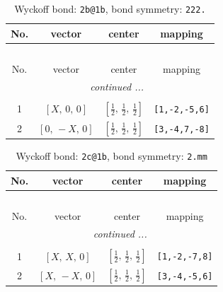 \documentclass[fleqn,8pt]{jsarticle}
\begin{document}
\renewcommand{\arraystretch}{1.2}
\begin{longtable}{cccc}
\caption{Wyckoff bond: {\tt 2b@1b}, bond symmetry: {\tt 222.}}
 \\
 \hline \hline
No. & vector & center & mapping \\ \hline \endfirsthead

\multicolumn{3}{l}{\tablename\ \thetable{}} \\
 \hline \hline
No. & vector & center & mapping \\ \hline \endhead

 \hline \hline
\multicolumn{3}{r}{\footnotesize\it continued ...} \\ \endfoot

 \hline \hline
\multicolumn{3}{r}{} \\ \endlastfoot

1 & $\left[ X,\, 0,\, 0 \right]$ & $\left[ \frac{1}{2},\, \frac{1}{2},\, \frac{1}{2} \right]$ & {\tt [1,-2,-5,6]} \\ \hline
2 & $\left[ 0,\, - X,\, 0 \right]$ & $\left[ \frac{1}{2},\, \frac{1}{2},\, \frac{1}{2} \right]$ & {\tt [3,-4,7,-8]} \\
\end{longtable}
\renewcommand{\arraystretch}{1.2}
\begin{longtable}{cccc}
\caption{Wyckoff bond: {\tt 2c@1b}, bond symmetry: {\tt 2.mm}}
 \\
 \hline \hline
No. & vector & center & mapping \\ \hline \endfirsthead

\multicolumn{3}{l}{\tablename\ \thetable{}} \\
 \hline \hline
No. & vector & center & mapping \\ \hline \endhead

 \hline \hline
\multicolumn{3}{r}{\footnotesize\it continued ...} \\ \endfoot

 \hline \hline
\multicolumn{3}{r}{} \\ \endlastfoot

1 & $\left[ X,\, X,\, 0 \right]$ & $\left[ \frac{1}{2},\, \frac{1}{2},\, \frac{1}{2} \right]$ & {\tt [1,-2,-7,8]} \\ \hline
2 & $\left[ X,\, - X,\, 0 \right]$ & $\left[ \frac{1}{2},\, \frac{1}{2},\, \frac{1}{2} \right]$ & {\tt [3,-4,-5,6]} \\
\end{longtable}
\renewcommand{\arraystretch}{1.2}
\end{document}
